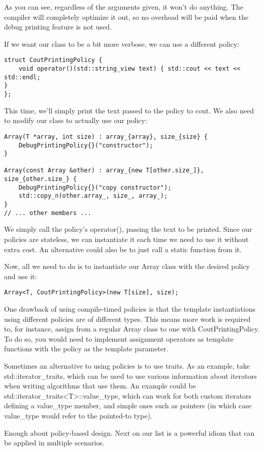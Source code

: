 As you can see, regardless of the arguments given, it won't do anything. The compiler will completely optimize it out, so no overhead will be paid when the debug printing feature is not used.

If we want our class to be a bit more verbose, we can use a different policy:

\begin{lstlisting}[style=styleCXX]
struct CoutPrintingPolicy {
	void operator()(std::string_view text) { std::cout << text << std::endl;
}
};
\end{lstlisting}

This time, we'll simply print the text passed to the policy to cout. We also need to modify our class to actually use our policy:

\begin{lstlisting}[style=styleCXX]
Array(T *array, int size) : array_{array}, size_{size} {
	DebugPrintingPolicy{}("constructor");
}

Array(const Array &other) : array_{new T[other.size_]},
size_{other.size_} {
	DebugPrintingPolicy{}("copy constructor");
	std::copy_n(other.array_, size_, array_);
}
// ... other members ...
\end{lstlisting}

We simply call the policy's operator(), passing the text to be printed. Since our policies are stateless, we can instantiate it each time we need to use it without extra cost. An alternative could also be to just call a static function from it.

Now, all we need to do is to instantiate our Array class with the desired policy and use it:

\begin{lstlisting}[style=styleCXX]
Array<T, CoutPrintingPolicy>(new T[size], size);
\end{lstlisting}

One drawback of using compile-timed policies is that the template instantiations using different policies are of different types. This means more work is required to, for instance, assign from a regular Array class to one with CoutPrintingPolicy. To do so, you would need to implement assignment operators as template functions with the policy as the template parameter.

Sometimes an alternative to using policies is to use traits. As an example, take std::iterator\_traits, which can be used to use various information about iterators when writing algorithms that use them. An example could be std::iterator\_traits<T>::value\_type, which can work for both custom iterators defining a value\_type member, and simple ones such as pointers (in which case value\_type would refer to the pointed-to type).

Enough about policy-based design. Next on our list is a powerful idiom that can be applied in multiple scenarios.









